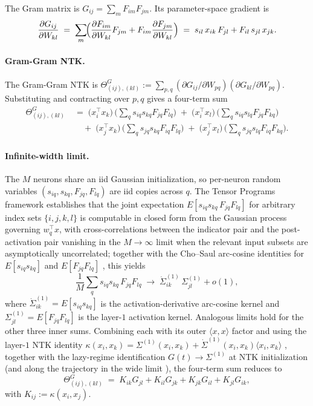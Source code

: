 \documentclass{article}
\newcommand{\E}{E}
\begin{document}
The Gram matrix is $G_{ij} = \sum_m F_{im}F_{jm}$. Its parameter-space
gradient is
\[
\frac{\partial G_{ij}}{\partial W_{kl}}
\;=\; \sum_m \!\Bigl(\frac{\partial F_{im}}{\partial W_{kl}} F_{jm}
+ F_{im}\frac{\partial F_{jm}}{\partial W_{kl}}\Bigr)
\;=\; s_{il}\,x_{ik}\,F_{jl} + F_{il}\,s_{jl}\,x_{jk}.
\]

\paragraph{Gram-Gram NTK.}
The Gram-Gram NTK is
$\Theta^G_{(ij),(kl)} := \sum_{p,q}
(\partial G_{ij}/\partial W_{pq})(\partial G_{kl}/\partial W_{pq})$.
Substituting and contracting over $p, q$ gives a four-term sum
\begin{align*}
\Theta^G_{(ij),(kl)} \;&=\;
\bigl(x_i^\top x_k\bigr)\,\bigl(\textstyle\sum_q s_{iq}s_{kq}F_{jq}F_{lq}\bigr)
\;+\; \bigl(x_i^\top x_l\bigr)\,\bigl(\textstyle\sum_q s_{iq}s_{lq}F_{jq}F_{kq}\bigr) \\
&\quad+\; \bigl(x_j^\top x_k\bigr)\,\bigl(\textstyle\sum_q s_{jq}s_{kq}F_{iq}F_{lq}\bigr)
\;+\; \bigl(x_j^\top x_l\bigr)\,\bigl(\textstyle\sum_q s_{jq}s_{lq}F_{iq}F_{kq}\bigr).
\end{align*}

\paragraph{Infinite-width limit.}
The $M$ neurons share an iid Gaussian initialization, so per-neuron
random variables $(s_{iq}, s_{kq}, F_{jq}, F_{lq})$ are iid copies
across $q$. The Tensor Programs framework \citep{yang2020tensor}
establishes that the joint expectation
$\E[s_{iq}s_{kq}\,F_{jq}F_{lq}]$ for arbitrary index sets
$\{i, j, k, l\}$ is computable in closed form from the Gaussian
process governing $w_q^\top x$, with cross-correlations between the
indicator pair and the post-activation pair vanishing in the
$M \to \infty$ limit when the relevant input subsets are
asymptotically uncorrelated; together with the Cho--Saul arc-cosine
identities for $\E[s_{iq}s_{kq}]$ and $\E[F_{jq}F_{lq}]$
\citep{cho2009kernel,jacot2018neural}, this yields
\[
\textstyle\frac{1}{M}\sum_q s_{iq}s_{kq}\,F_{jq}F_{lq}
\;\to\; \dot{\Sigma}^{(1)}_{ik}\,\Sigma^{(1)}_{jl} + o(1),
\]
where $\dot{\Sigma}^{(1)}_{ik} = \E[s_{iq}s_{kq}]$ is the
activation-derivative arc-cosine kernel and
$\Sigma^{(1)}_{jl} = \E[F_{jq}F_{lq}]$ is the layer-$1$ activation
kernel. Analogous limits hold for the other three
inner sums. Combining each with its outer $\langle x, x\rangle$ factor and
using the layer-$1$ NTK identity
$\kappa(x_i, x_k) = \Sigma^{(1)}(x_i, x_k) + \dot{\Sigma}^{(1)}(x_i, x_k)\langle x_i, x_k\rangle$
\citep{jacot2018neural}, together with the lazy-regime identification
$G(t) \to \Sigma^{(1)}$ at NTK initialization (and along the trajectory
in the wide limit \citep{lee2019wide}), the four-term sum reduces to
\[
\Theta^G_{(ij),(kl)} \;=\; K_{ik}G_{jl} + K_{il}G_{jk} + K_{jk}G_{il} + K_{jl}G_{ik},
\]
with $K_{ij} := \kappa(x_i, x_j)$.
\end{document}
